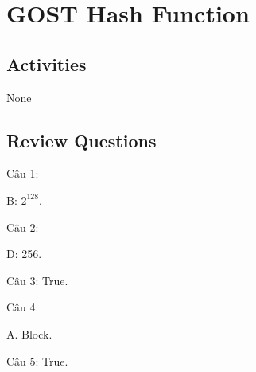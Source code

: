 \section{GOST Hash Function}
\subsection{Activities}

None

\subsection{Review Questions}

\noindent Câu 1: 

B: $2^{128}$.

\noindent Câu 2: 

D: 256.

\noindent Câu 3: True.

\noindent Câu 4: 

A. Block.

\noindent Câu 5: True.